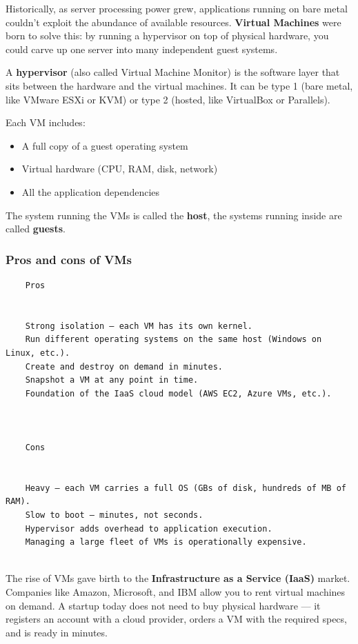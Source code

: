 \documentclass[11pt,american,a4paper,openany]{book}
\providecommand{\tightlist}{%
  \setlength{\itemsep}{2pt}\setlength{\parskip}{0pt}}
\begin{document}
Historically, as server processing power grew, applications running on
bare metal couldn't exploit the abundance of available resources.
\textbf{Virtual Machines} were born to solve this: by running a
hypervisor on top of physical hardware, you could carve up one server
into many independent guest systems.

A \textbf{hypervisor} (also called Virtual Machine Monitor) is the
software layer that sits between the hardware and the virtual machines.
It can be type 1 (bare metal, like VMware ESXi or KVM) or type 2
(hosted, like VirtualBox or Parallels).

Each VM includes:

\begin{itemize}
\tightlist
\item
  A full copy of a guest operating system
\item
  Virtual hardware (CPU, RAM, disk, network)
\item
  All the application dependencies
\end{itemize}

The system running the VMs is called the \textbf{host}, the systems
running inside are called \textbf{guests}.

\subsubsection{Pros and cons of VMs}\label{pros-and-cons-of-vms}

\begin{verbatim}
    Pros
  
  
    Strong isolation — each VM has its own kernel.
    Run different operating systems on the same host (Windows on Linux, etc.).
    Create and destroy on demand in minutes.
    Snapshot a VM at any point in time.
    Foundation of the IaaS cloud model (AWS EC2, Azure VMs, etc.).
  


    Cons
  
  
    Heavy — each VM carries a full OS (GBs of disk, hundreds of MB of RAM).
    Slow to boot — minutes, not seconds.
    Hypervisor adds overhead to application execution.
    Managing a large fleet of VMs is operationally expensive.
  
\end{verbatim}

The rise of VMs gave birth to the \textbf{Infrastructure as a Service
(IaaS)} market. Companies like Amazon, Microsoft, and IBM allow you to
rent virtual machines on demand. A startup today does not need to buy
physical hardware --- it registers an account with a cloud provider,
orders a VM with the required specs, and is ready in minutes.
\end{document}

